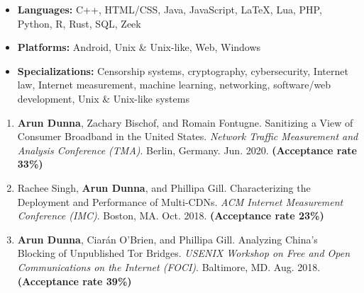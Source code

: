 
\begin{itemize}
  \item \textbf{Languages:} C++, HTML/CSS, Java, JavaScript, LaTeX, Lua, PHP, Python, R, Rust, SQL, Zeek
  \item \textbf{Platforms:} Android, Unix \& Unix-like, Web, Windows
  \item \textbf{Specializations:} Censorship systems, cryptography, cybersecurity, Internet law, Internet measurement, machine learning, networking, software/web development, Unix \& Unix-like systems

\end{itemize}

\newpage


\begin{enumerate}
 \item \textbf{Arun Dunna}, Zachary Bischof, and Romain Fontugne. Sanitizing a View of Consumer Broadband in the United States. \textit{Network Traffic Measurement and Analysis Conference (TMA)}. Berlin, Germany. Jun. 2020. \textbf{(Acceptance rate 33\%)}
 \item Rachee Singh, \textbf{Arun Dunna}, and Phillipa Gill. Characterizing the Deployment and Performance of Multi-CDNs. \textit{ACM Internet Measurement Conference (IMC)}. Boston, MA. Oct. 2018. \textbf{(Acceptance rate 23\%)}
 \item \textbf{Arun Dunna}, Ciar\'an O'Brien, and Phillipa Gill. Analyzing China's Blocking of Unpublished Tor Bridges. \textit{USENIX Workshop on Free and Open Communications on the Internet (FOCI)}. Baltimore, MD. Aug. 2018. \textbf{(Acceptance rate 39\%)}
\end{enumerate}


\begin{itemize}
  \setlength{\itemsep}{0pt}
\end{itemize}


\begin{itemize}
  \setlength{\itemsep}{0pt}
\end{itemize}

